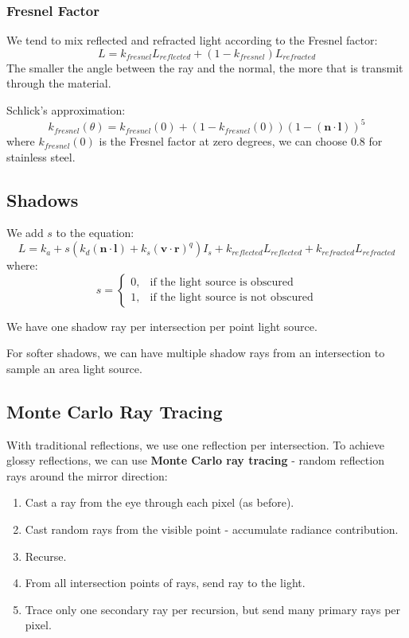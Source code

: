 \documentclass[11pt]{article}
\begin{document}
\subsubsection{Fresnel Factor}
We tend to mix reflected and refracted light according to the Fresnel factor:
\[
  L = k_{fresnel} L_{reflected} + (1 - k_{fresnel}) L_{refracted} 
\]
The smaller the angle between the ray and the normal, the more that is transmit through the material.

Schlick's approximation:
\[
  k_{fresnel} (\theta) = k_{fresnel} (0) + (1 - k_{fresnel}(0)) (1 - (\bm{n} \cdot \bm{l}))^5
\]
where $k_{fresnel}(0)$ is the Fresnel factor at zero degrees, we can choose $0.8$ for stainless steel.

\subsection{Shadows}
We add $s$ to the equation:
\[
  L = k_a + s(k_d (\bm{n} \cdot \bm{l}) + k_s(\bm{v} \cdot \bm{r})^q)I_s + k_{reflected} L_{reflected} + k_{refracted}L_{refracted}
\]
where:
\[
  s =
  \begin{cases}
    0, & \text{if the light source is obscured} \\
    1, & \text{if the light source is not obscured}
  \end{cases}
\]

We have one shadow ray per intersection per point light source.

For softer shadows, we can have multiple shadow rays from an intersection to sample an area light source.

\subsection{Monte Carlo Ray Tracing}
With traditional reflections, we use one reflection per intersection.
To achieve glossy reflections, we can use \textbf{Monte Carlo ray tracing} - random reflection rays around the mirror direction:
\begin{enumerate}
  \item Cast a ray from the eye through each pixel (as before).
  \item Cast random rays from the visible point - accumulate radiance contribution.
  \item Recurse.
  \item From all intersection points of rays, send ray to the light.
  \item Trace only one secondary ray per recursion, but send many primary rays per pixel.
\end{enumerate}
\end{document}
